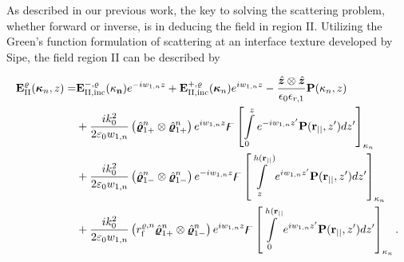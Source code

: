 \documentclass[ floatfix,reprint,amsmath,amssymb,aps,prb]{revtex4-1}
\begin{document}
\begin{widetext}
As described in our previous work\cite{Abass2017}, the key to solving the scattering problem, whether forward or inverse, is in deducing the field in region II. Utilizing the Green's function formulation of scattering at an interface texture developed by Sipe\citep{Sipe:87,Rottenberg:2011}, the field region II can be described by 

\begin{align}
\mathbf{E}^{\varrho}_{\mathrm{II}}(\boldsymbol{\kappa}_{n},z)= & \mathbf{E}^{-,\varrho}_{\mathrm{II,inc}}(\mathbf{\kappa_{n}}) e^{-iw_{1,n}z}\nonumber +\mathbf{E}^{+,\varrho}_{\mathrm{II,inc}}(\boldsymbol{\kappa}_n) e^{iw_{1,n}z}\nonumber -\frac{\hat{\boldsymbol{z}}\otimes\hat{\boldsymbol{z}}}{\epsilon_{0}\epsilon_{r,1}}\mathbf{P}(\kappa_{n},z) \\
 & +\frac{ik_{0}^{2}}{2\varepsilon_{0}w_{1,n}}\left(\hat{\boldsymbol{\varrho}}_{1+}^{n}\otimes\hat{\boldsymbol{\varrho}}_{1+}^{n}\right)e^{iw_{1,n}z}\mathbf{\digamma}\left[\intop_{0}^{z}e^{-iw_{1,n}z'}\mathbf{P}(\mathbf{r_{||}},z')dz'\right]_{\kappa_{n}}\nonumber \\
 & +\frac{ik_{0}^{2}}{2\varepsilon_{0}w_{1,n}}\left(\hat{\boldsymbol{\varrho}}{}_{1-}^{n}\otimes\hat{\boldsymbol{\varrho}}{}_{1-}^{n} \right)e^{-iw_{1,n}z}\mathbf{\digamma}\left[\intop_{z}^{h(\mathbf{r_{||}})}e^{iw_{1,n}z'}\mathbf{P}(\mathbf{r_{||}},z')dz'\right]_{\kappa_{n}}\nonumber \\
 & +\frac{ik_{0}^{2}}{2\varepsilon_{0}w_{1,n}}\left(r_{\textnormal{f}}^{\varrho, n} \hat{\boldsymbol{\varrho }}_{1+}^{n}\otimes\hat{\boldsymbol{\varrho}}{}_{1-}^{n} \right)e^{iw_{1,n}z}\mathbf{\digamma}\left[\intop_{0}^{h(\mathbf{r_{||}}}e^{iw_{1,n}z'}\mathbf{P}(\mathbf{r_{||}},z')dz'\right]_{\kappa_{n}}.\label{eq:Main}
\end{align}


\end{widetext}
\end{document}
